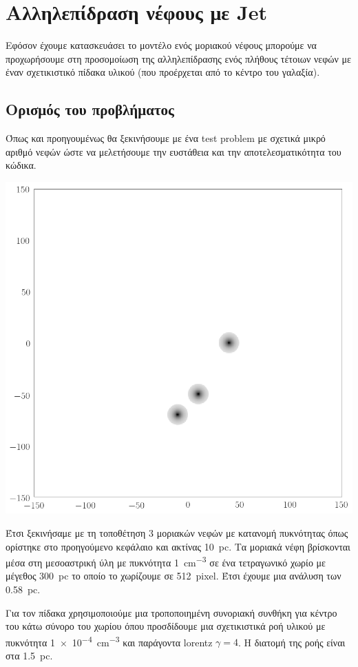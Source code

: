 \section{Αλληλεπίδραση νέφους με Jet}
	Εφόσον έχουμε κατασκευάσει το μοντέλο ενός μοριακού νέφους μπορούμε να προχωρήσουμε στη προσομοίωση της αλληλεπίδρασης ενός πλήθους τέτοιων νεφών με έναν σχετικιστικό πίδακα υλικού (που προέρχεται από το κέντρο του γαλαξία).
	
\subsection{Ορισμός του προβλήματος}
	Όπως και προηγουμένως θα ξεκινήσουμε με ένα test problem με σχετικά μικρό αριθμό νεφών ώστε να μελετήσουμε την ευστάθεια και την αποτελεσματικότητα του κώδικα.
	
\begin{marginfigure}
	\centering
	\includegraphics[width=1\linewidth]{DataImages/Jet0}
	\caption{}
	\label{fig:jet0}
\end{marginfigure}

	Έτσι ξεκινήσαμε με τη τοποθέτηση 3 μοριακών νεφών με κατανομή πυκνότητας όπως ορίστηκε στο προηγούμενο κεφάλαιο και ακτίνας \SI{10}{pc}. Τα μοριακά νέφη βρίσκονται μέσα στη μεσοαστρική ύλη με πυκνότητα \SI{1}{cm^{-3}} σε ένα τετραγωνικό χωρίο με μέγεθος \SI{300}{pc} το οποίο το χωρίζουμε σε \SI{512}{pixel}. Έτσι έχουμε μια ανάλυση των \SI{0.58}{pc}. 
	
	Για τον πίδακα χρησιμοποιούμε μια τροποποιημένη συνοριακή συνθήκη για κέντρο του κάτω σύνορο του χωρίου όπου προσδίδουμε μια σχετικιστικά ροή υλικού με πυκνότητα \SI{1e-4}{cm^{-3}} και παράγοντα lorentz $\gamma = 4$. Η διατομή της ροής είναι στα \SI{1.5}{pc}.
	
	 
	
		

